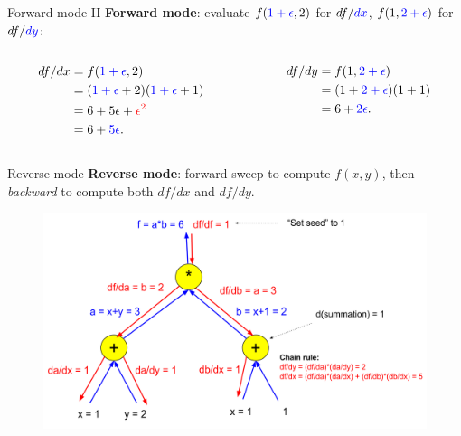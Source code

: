\documentclass{beamer}
\begin{document}
\begin{frame}{Forward mode II}
    \textbf{Forward mode}: evaluate $f({\color{blue}1+\epsilon}, 2)$ for $df/{\color{blue}dx}$, $f(1, {\color{blue}2+\epsilon})$ for $df/{\color{blue}dy}$:
    \begin{columns}
        \begin{column}{0.5\textwidth}
            \begin{equation}
                \begin{split}
                    df/dx & = f({\color{blue}1+\epsilon}, 2) \\
                    & = ({\color{blue}1+\epsilon}+2)({\color{blue}1+\epsilon}+1) \\
                    & = 6+5\epsilon+{\color{red}\epsilon^2} \\
                    & = 6 + {\color{blue}5\epsilon}.
                \end{split}
            \end{equation}
        \end{column}
        \vrule{}
        \begin{column}{0.5\textwidth}
            \begin{equation}
                \begin{split}
                    df/dy & = f(1, {\color{blue}2+\epsilon}) \\
                    & = (1 + {\color{blue}2 + \epsilon})(1+1) \\
                    & = 6 + {\color{blue}2\epsilon}.
                \end{split}
            \end{equation}
        \end{column}
    \end{columns}
    \vspace{0.3cm}
\end{frame}

\begin{frame}{Reverse mode}
    \fontsize{9}{6}\selectfont
    \textbf{Reverse mode}: {\color{blue}forward} sweep to compute {\color{blue}$f(x,y)$}, then {\color{red}\textit{backward}} to compute both {\color{red}$df/dx$} and {\color{red}$df/dy$}.
     \begin{figure}[H]
        \centering
            \includegraphics[scale=0.5]{img/slide/reversediff.png}
        \label{fig:reversediff}
    \end{figure}
\end{frame}
\end{document}
